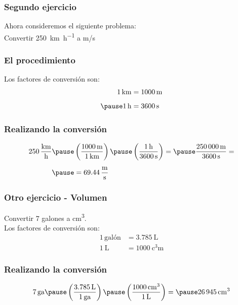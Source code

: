 \documentclass[14pt]{beamer}
\begin{document}
\begin{frame}
\frametitle{Segundo ejercicio}
Ahora consideremos el siguiente problema:
\\
\bigskip
\pause
Convertir \SI{250}{\kilo\meter\per\hour} a m/s
\end{frame}
\begin{frame}
\frametitle{El procedimiento}
Los factores de conversión son:
\pause
\begin{eqnarray*}
\begin{aligned}
\SI{1}{\kilo\meter} &= \SI{1000}{\meter} \\[0.5em] \pause
\SI{1}{\hour} &= \SI{3600}{\second}
\end{aligned}
\end{eqnarray*}
\end{frame}
\begin{frame}
\frametitle{Realizando la conversión}
\begin{eqnarray*}
\begin{aligned}
\SI[per-mode=fraction]{250}{\kilo\meter\per\hour} \pause &\left( \dfrac{\SI{1000}{\meter}}{\SI{1}{\kilo\meter}} \right) \pause \left( \dfrac{\SI{1}{\hour}}{\SI{3600}{\second}} \right) = \pause \dfrac{\SI{250000}{\meter}}{\SI{3600}{\second}} = \\[0.5em] \pause
&= \SI[per-mode=fraction]{69.44}{\meter\per\second}
\end{aligned}
\end{eqnarray*}
\end{frame}
\begin{frame}
\frametitle{Otro ejercicio - Volumen}
Convertir $7$ galones a \unit{\cubic\centi\meter}.
\\
\bigskip
Los factores de conversión son:
\pause
\begin{align*}
1 \, \text{galón} &= \SI{3.785}{\liter} \\[0.5em]
\SI{1}{\liter} &= \SI{1000}{\cubic\centi\meter}
\end{align*}
\end{frame}
\begin{frame}
\frametitle{Realizando la conversión}
\begin{eqnarray*}
\begin{aligned}
7 \, \text{ga} \pause \left( \dfrac{\SI{3.785}{\liter}}{1 \, \text{ga}} \right) \pause \left( \dfrac{\SI{1000}{\cubic\centi\meter}}{\SI{1}{\liter}} \right) = \pause \SI{26945}{\cubic\centi\meter}
\end{aligned}
\end{eqnarray*}
\end{frame}
\end{document}
